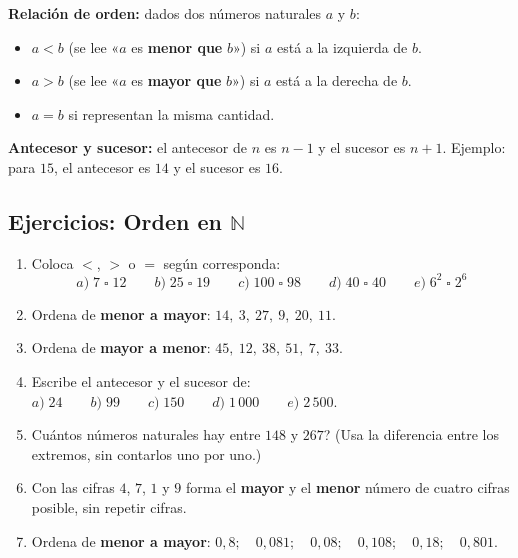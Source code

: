 \documentclass[12pt, letterpaper]{article}
\newcommand{\N}{\mathbb{N}}
\begin{document}
\begin{center}
\end{center}

\begin{cuadroteoria}
  \textbf{Relación de orden:} dados dos números naturales $a$ y $b$:
  \begin{itemize}[leftmargin=*]
    \item $a < b$ (se lee «$a$ es \textbf{menor que} $b$») si $a$ está a la izquierda de $b$.
    \item $a > b$ (se lee «$a$ es \textbf{mayor que} $b$») si $a$ está a la derecha de $b$.
    \item $a = b$ si representan la misma cantidad.
  \end{itemize}
  \textbf{Antecesor y sucesor:} el antecesor de $n$ es $n-1$ y el sucesor es $n+1$. Ejemplo: para $15$, el antecesor es $14$ y el sucesor es $16$.
\end{cuadroteoria}

\subsection{Ejercicios: Orden en $\N$}

\begin{enumerate}[leftmargin=*]
  \item \facil{} Coloca $<$, $>$ o $=$ según corresponda:
        \[ a)\; 7 \;\square\; 12 \qquad b)\; 25 \;\square\; 19 \qquad c)\; 100 \;\square\; 98 \qquad d)\; 40 \;\square\; 40 \qquad e)\; 6^2 \;\square\; 2^6 \]

  \item \facil{} Ordena de \textbf{menor a mayor}: $14,\ 3,\ 27,\ 9,\ 20,\ 11$.

  \item \facil{} Ordena de \textbf{mayor a menor}: $45,\ 12,\ 38,\ 51,\ 7,\ 33$.

  \item \medio{} Escribe el antecesor y el sucesor de: $a)\; 24 \qquad b)\; 99 \qquad c)\; 150 \qquad d)\; 1\,000 \qquad e)\; 2\,500$.

  \item \medio{} \textquestiondown Cuántos números naturales hay entre $148$ y $267$? (Usa la diferencia entre los extremos, sin contarlos uno por uno.)

  \item \dificil{} Con las cifras $4$, $7$, $1$ y $9$ forma el \textbf{mayor} y el \textbf{menor} número de cuatro cifras posible, sin repetir cifras.

  \item \dificil{} Ordena de \textbf{menor a mayor}: $0{,}8;\quad 0{,}081;\quad 0{,}08;\quad 0{,}108;\quad 0{,}18;\quad 0{,}801$.
\end{enumerate}
\end{document}
